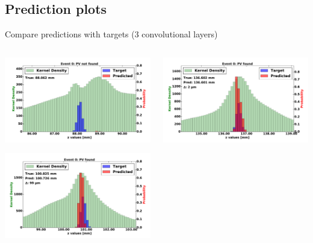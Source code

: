 \subsection{Prediction plots}

\begin{frame}{Compare predictions with targets (3 convolutional layers)}
  \begin{columns}[c]
        \begin{center}
            \includegraphics[width=1\textwidth,height=0.45\textwidth, trim=18 0 18 0]{images/120000_3layer_00.pdf}

            \includegraphics[width=1\textwidth, height=0.45\textwidth,trim=18 0 18 0]{images/120000_3layer_01.pdf}

        \end{center}
        \begin{center}
           \includegraphics[width=1\textwidth, height=0.45\textwidth, trim=18 0 18 0]{images/120000_3layer_02.pdf}


\end{center}
\end{columns}
\end{frame}
